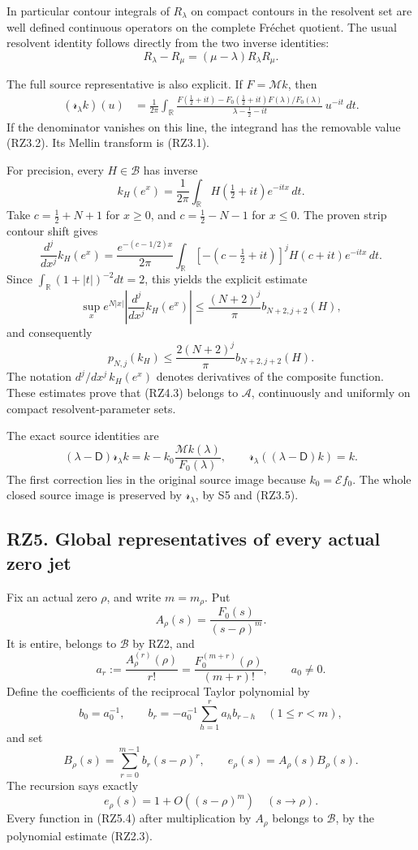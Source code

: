 \documentclass[
]{article}
\begin{document}
In particular contour integrals of \(R_\lambda\) on compact contours in
the resolvent set are well defined continuous operators on the complete
Fréchet quotient. The usual resolvent identity follows directly from the
two inverse identities: \[
R_\lambda-R_\mu=(\mu-\lambda)R_\lambda R_\mu.
\tag{RZ4.2}
\]

The full source representative is also explicit. If \(F=\mathcal Mk\),
then \[
\begin{aligned}
(\mathscr r_\lambda k)(u)
&=\frac1{2\pi}\int_{\mathbb R}
\frac{F(\tfrac12+it)-
F_0(\tfrac12+it)F(\lambda)/F_0(\lambda)}
{\lambda-\tfrac12-it}\,u^{-it}\,dt .
\end{aligned}
\tag{RZ4.3}
\] If the denominator vanishes on this line, the integrand has the
removable value (RZ3.2). Its Mellin transform is (RZ3.1).

For precision, every \(H\in\mathcal B\) has inverse \[
k_H(e^x)=\frac1{2\pi}\int_{\mathbb R}
H(\tfrac12+it)e^{-itx}\,dt .
\tag{RZ4.4}
\] Take \(c=\tfrac12+N+1\) for \(x\geq0\), and \(c=\tfrac12-N-1\) for
\(x\leq0\). The proven strip contour shift gives \[
\frac{d^j}{dx^j}k_H(e^x)
=\frac{e^{-(c-1/2)x}}{2\pi}
\int_{\mathbb R}[-(c-\tfrac12+it)]^j
H(c+it)e^{-itx}\,dt.
\tag{RZ4.5}
\] Since \(\int_{\mathbb R}(1+|t|)^{-2}dt=2\), this yields the explicit
estimate \[
\sup_x e^{N|x|}
\left|\frac{d^j}{dx^j}k_H(e^x)\right|
\leq\frac{(N+2)^j}{\pi}b_{N+2,j+2}(H),
\tag{RZ4.6}
\] and consequently \[
p_{N,j}(k_H)\leq
\frac{2(N+2)^j}{\pi}b_{N+2,j+2}(H).
\tag{RZ4.7}
\] The notation \(d^j/dx^j\,k_H(e^x)\) denotes derivatives of the
composite function. These estimates prove that (RZ4.3) belongs to
\(\mathcal A\), continuously and uniformly on compact
resolvent-parameter sets.

The exact source identities are \[
(\lambda-\mathsf D)\mathscr r_\lambda k
=k-k_0\frac{\mathcal Mk(\lambda)}{F_0(\lambda)},
\qquad
\mathscr r_\lambda((\lambda-\mathsf D)k)=k.
\tag{RZ4.8}
\] The first correction lies in the original source image because
\(k_0=\mathcal Ef_0\). The whole closed source image is preserved by
\(\mathscr r_\lambda\), by S5 and (RZ3.5).

\subsection{RZ5. Global representatives of every actual zero
jet}\label{rz5.-global-representatives-of-every-actual-zero-jet}

Fix an actual zero \(\rho\), and write \(m=m_\rho\). Put \[
A_\rho(s)=\frac{F_0(s)}{(s-\rho)^m}.
\tag{RZ5.1}
\] It is entire, belongs to \(\mathcal B\) by RZ2, and \[
a_r:=\frac{A_\rho^{(r)}(\rho)}{r!}
=\frac{F_0^{(m+r)}(\rho)}{(m+r)!},
\qquad a_0\ne0.
\tag{RZ5.2}
\] Define the coefficients of the reciprocal Taylor polynomial by \[
b_0=a_0^{-1},\qquad
b_r=-a_0^{-1}\sum_{h=1}^r a_hb_{r-h}
\quad(1\leq r<m),
\tag{RZ5.3}
\] and set \[
B_\rho(s)=\sum_{r=0}^{m-1}b_r(s-\rho)^r,\qquad
e_\rho(s)=A_\rho(s)B_\rho(s).
\tag{RZ5.4}
\] The recursion says exactly \[
e_\rho(s)=1+O((s-\rho)^m)\quad(s\to\rho).
\tag{RZ5.5}
\] Every function in (RZ5.4) after multiplication by \(A_\rho\) belongs
to \(\mathcal B\), by the polynomial estimate (RZ2.3).
\end{document}
